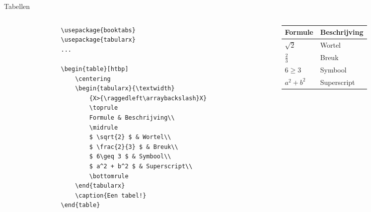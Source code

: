 \copyrightVincent

\begin{frame}[fragile]{Tabellen}
    \begin{columns}
        \begin{column}{0.5\textwidth}
            \begin{verbatim}
                \usepackage{booktabs}
                \usepackage{tabularx}
                ...

                \begin{table}[htbp]
                    \centering
                    \begin{tabularx}{\textwidth}
                        {X>{\raggedleft\arraybackslash}X}
                        \toprule
                        Formule & Beschrijving\\
                        \midrule
                        $ \sqrt{2} $ & Wortel\\
                        $ \frac{2}{3} $ & Breuk\\
                        $ 6\geq 3 $ & Symbool\\
                        $ a^2 + b^2 $ & Superscript\\
                        \bottomrule
                    \end{tabularx}
                    \caption{Een tabel!}
                \end{table}
            \end{verbatim}
        \end{column}
        \begin{column}{0.5\textwidth}
            \begin{adjustbox}{frame=1pt 10pt}%
                \begin{minipage}{\textwidth-22pt}
                    \begin{table}[H]
                        \centering
                        \begin{tabularx}{\textwidth}{X>{\raggedleft\arraybackslash}X}
                            \toprule
                            Formule & Beschrijving\\
                            \midrule
                            $ \sqrt{2} $ & Wortel\\
                            $ \frac{2}{3} $ & Breuk\\
                            $ 6\geq 3 $ & Symbool\\
                            $ a^2 + b^2 $ & Superscript\\

\end{tabularx}
\end{table}
\end{minipage}
\end{adjustbox}
\end{column}
\end{columns}
\end{frame}
